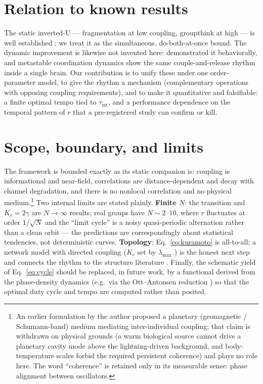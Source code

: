 \documentclass[11pt]{article}
\begin{document}
\section{Relation to known results}

The static inverted-U --- fragmentation at low coupling, groupthink at high --- is well established \citep{lorenz2011social, becker2017network, lazer2007network}; we treat it as the simultaneous, do-both-at-once bound. The dynamic improvement is likewise not invented here: \citet{bernstein2018intermittent} demonstrated it behaviorally, and metastable coordination dynamics \citep{tognoli2014metastable} show the same couple-and-release rhythm inside a single brain. Our contribution is to unify these under one order-parameter model, to give the rhythm a mechanism (complementary operations with opposing coupling requirements), and to make it quantitative and falsifiable: a finite optimal tempo tied to $\tau_{\text{int}}$, and a performance dependence on the temporal pattern of $r$ that a pre-registered study can confirm or kill.

\section{Scope, boundary, and limits}
\label{sec:scope}

The framework is bounded exactly as its static companion is: coupling is informational and near-field, correlations are distance-dependent and decay with channel degradation, and there is no nonlocal correlation and no physical medium.\footnote{An earlier formulation by the author proposed a planetary (geomagnetic / Schumann-band) medium mediating inter-individual coupling; that claim is withdrawn on physical grounds (a warm biological source cannot drive a planetary cavity mode above the lightning-driven background, and body-temperature scales forbid the required persistent coherence) and plays no role here. The word ``coherence'' is retained only in its measurable sense: phase alignment between oscillators.} Two internal limits are stated plainly. \textbf{Finite $N$}: the transition and $K_c=2\gamma$ are $N\to\infty$ results; real groups have $N\sim 2$--$10$, where $r$ fluctuates at order $1/\sqrt N$ and the ``limit cycle'' is a noisy quasi-periodic alternation rather than a clean orbit --- the predictions are correspondingly about statistical tendencies, not deterministic curves. \textbf{Topology}: Eq.~\eqref{eq:kuramoto} is all-to-all; a network model with directed coupling ($K_c$ set by $\lambda_{\max}$ \citep{restrepo2005onset}) is the honest next step and connects the rhythm to the structure literature \citep{lazer2007network, becker2017network}. Finally, the schematic yield of Eq.~\eqref{eq:cycle} should be replaced, in future work, by a functional derived from the phase-density dynamics (e.g.\ via the Ott--Antonsen reduction \citep{ott2008low}) so that the optimal duty cycle and tempo are computed rather than posited.
\end{document}

